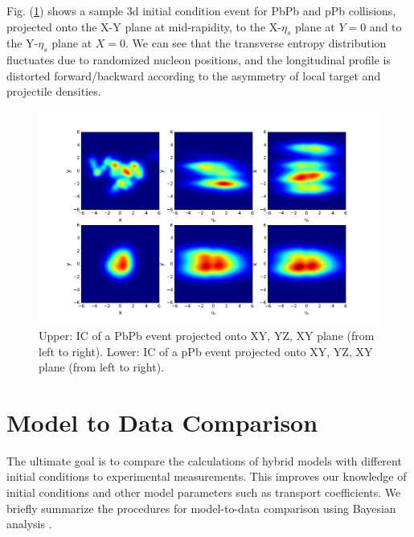 \documentclass[aps,prl,twocolumn,groupedaddress]{revtex4-1}
\begin{document}
	Fig. (\ref{3d-example}) shows a sample 3d initial condition event for PbPb and pPb collisions, projected onto the X-Y plane at mid-rapidity, to the X-$\eta_s$ plane at $Y = 0$ and to the Y-$\eta_s$ plane at $X = 0$. We can see that the transverse entropy distribution fluctuates due to randomized nucleon positions, and the longitudinal profile is distorted forward/backward according to the asymmetry of local target and projectile densities. 
	
	\begin{figure}
	\begin{center}
	\includegraphics[width=1.0\columnwidth]{pics/3d-example.png}
	\caption{Upper: IC of a PbPb event projected onto XY, YZ, XY plane (from left to right). Lower: IC of a pPb event projected onto XY, YZ, XY plane (from left to right).}\label{3d-example}
	\end{center}
	\end{figure}
	

\section{Model to Data Comparison}
	The ultimate goal is to compare the calculations of hybrid models with different initial conditions to experimental measurements. This improves our knowledge of initial conditions and other model parameters such as transport coefficients. We briefly summarize the procedures for model-to-data comparison using Bayesian analysis \citep{Dave:10.2307/27640080, Bernhard:2015hxa}. 
\end{document}
